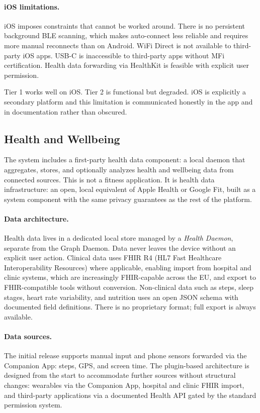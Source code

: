 \paragraph{iOS limitations.}
iOS imposes constraints that cannot be worked around. There is no persistent
background BLE scanning, which makes auto-connect less reliable and requires
more manual reconnects than on Android. WiFi Direct is not available to
third-party iOS apps. USB-C is inaccessible to third-party apps without
MFi certification. Health data forwarding via HealthKit is feasible with
explicit user permission.

Tier 1 works well on iOS. Tier 2 is functional but degraded. iOS is explicitly
a secondary platform and this limitation is communicated honestly in the app
and in documentation rather than obscured.

\subsection{Health and Wellbeing}
\label{sec:health}

The system includes a first-party health data component: a local daemon that
aggregates, stores, and optionally analyzes health and wellbeing data from
connected sources. This is not a fitness application. It is health data
infrastructure: an open, local equivalent of Apple Health or Google Fit, built
as a system component with the same privacy guarantees as the rest of the
platform.

\paragraph{Data architecture.}
Health data lives in a dedicated local store managed by a \emph{Health Daemon},
separate from the Graph Daemon. Data never leaves the device without an
explicit user action. Clinical data uses FHIR R4 (HL7 Fast Healthcare
Interoperability Resources) where applicable, enabling import from hospital and
clinic systems, which are increasingly FHIR-capable across the EU, and export
to FHIR-compatible tools without conversion. Non-clinical data such as steps,
sleep stages, heart rate variability, and nutrition uses an open JSON schema
with documented field definitions. There is no proprietary format; full export
is always available.

\paragraph{Data sources.}
The initial release supports manual input and phone sensors forwarded via the
Companion App: steps, GPS, and screen time. The plugin-based architecture is
designed from the start to accommodate further sources without structural
changes: wearables via the Companion App, hospital and clinic FHIR import, and
third-party applications via a documented Health API gated by the standard
permission system.

